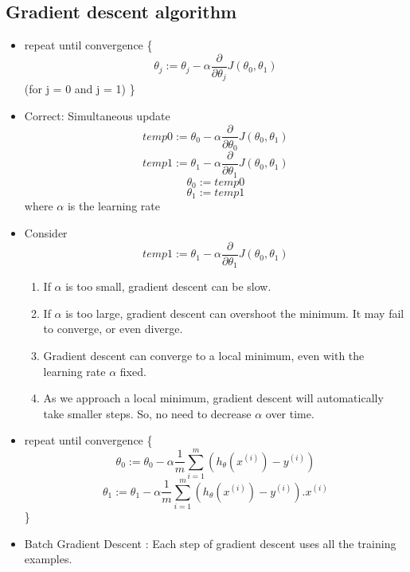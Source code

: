 \documentclass[13pt]{book}
\begin{document}
 \subsection{Gradient descent algorithm}
 \begin{itemize}
 \item repeat until convergence \{
   \begin{equation}
     \theta_j := \theta_j - \alpha\frac{\partial}{\partial\theta_j}J(\theta_0, \theta_1)
   \end{equation}
    (for j = 0 and j = 1)
 \}
\item Correct{:} Simultaneous update
   \begin{equation}
     temp0 := \theta_0 - \alpha\frac{\partial}{\partial\theta_0}J(\theta_0, \theta_1)
   \end{equation}
   \begin{equation}
     temp1 := \theta_1 - \alpha\frac{\partial}{\partial\theta_1}J(\theta_0, \theta_1)
   \end{equation}
   \begin{equation}
     \theta_0 := temp0
   \end{equation}
   \begin{equation}
     \theta_1 := temp1 
   \end{equation}
  where \(\alpha\) is the learning rate
\item Consider
   \begin{equation}
     temp1 := \theta_1 - \alpha\frac{\partial}{\partial\theta_1}J(\theta_0, \theta_1)
   \end{equation}
   \begin{enumerate}
   \item If \(\alpha\) is too small, gradient descent can be slow.
   \item If \(\alpha\) is too large, gradient descent can overshoot the minimum. It may fail to converge, or even diverge.
   \item Gradient descent can converge to a local minimum, even with the learning rate \(\alpha\) fixed.
   \item As we approach a local minimum, gradient descent will automatically take smaller steps. So, no need to decrease \(\alpha\) over time.
     \end{enumerate}
 \item repeat until convergence \{
   \begin{equation}
     \theta_0 := \theta_0 - \alpha\frac{1}{m}\sum_{i=1}^m(h_\theta(x^{(i)}) - y^{(i)})
   \end{equation}
   \begin{equation}
     \theta_1 := \theta_1 - \alpha\frac{1}{m}\sum_{i=1}^m(h_\theta(x^{(i)}) - y^{(i)}).x^{(i)}     
   \end{equation}
    \}
 \item Batch Gradient Descent {:}
   Each step of gradient descent uses all the training examples.
  
  \end{itemize}
\end{document}
